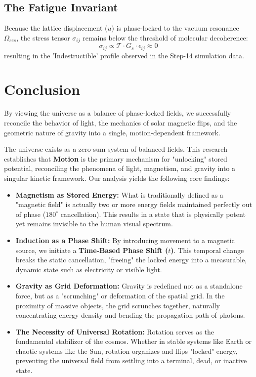 \documentclass[11pt]{article}
\begin{document}
\subsection{The Fatigue Invariant}
Because the lattice displacement ($u$) is phase-locked to the vacuum resonance $\Omega_{res}$, the stress tensor $\sigma_{ij}$ remains below the threshold of molecular decoherence:
\begin{equation}
    \sigma_{ij} \propto \mathcal{T} \cdot G_s \cdot \epsilon_{ij} \approx 0
\end{equation}
resulting in the 'Indestructible' profile observed in the Step-14 simulation data.
\section{Conclusion}

By viewing the universe as a balance of phase-locked fields, we successfully reconcile the behavior of light, the mechanics of solar magnetic flips, and the geometric nature of gravity into a single, motion-dependent framework.

The universe exists as a zero-sum system of balanced fields. This research establishes that \textbf{Motion} is the primary mechanism for "unlocking" stored potential, reconciling the phenomena of light, magnetism, and gravity into a singular kinetic framework. Our analysis yields the following core findings:

\begin{itemize}
    \item \textbf{Magnetism as Stored Energy:} What is traditionally defined as a "magnetic field" is actually two or more energy fields maintained perfectly out of phase ($180^\circ$ cancellation). This results in a state that is physically potent yet remains invisible to the human visual spectrum.
    
    \item \textbf{Induction as a Phase Shift:} By introducing movement to a magnetic source, we initiate a \textbf{Time-Based Phase Shift ($t$)}. This temporal change breaks the static cancellation, "freeing" the locked energy into a measurable, dynamic state such as electricity or visible light.
    
    \item \textbf{Gravity as Grid Deformation:} Gravity is redefined not as a standalone force, but as a "scrunching" or deformation of the spatial grid. In the proximity of massive objects, the grid scrunches together, naturally concentrating energy density and bending the propagation path of photons.
    
    \item \textbf{The Necessity of Universal Rotation:} Rotation serves as the fundamental stabilizer of the cosmos. Whether in stable systems like Earth or chaotic systems like the Sun, rotation organizes and flips "locked" energy, preventing the universal field from settling into a terminal, dead, or inactive state.
\end{itemize}
\end{document}
